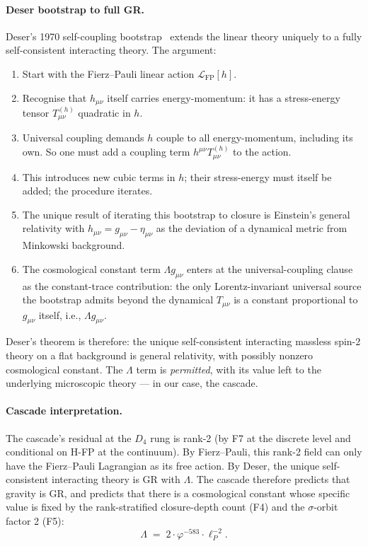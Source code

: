 \documentclass[11pt]{article}
\theoremstyle{plain}
\theoremstyle{definition}
\theoremstyle{remark}
\begin{document}
\paragraph{Deser bootstrap to full GR.}
Deser's 1970 self-coupling bootstrap~\citep{Deser1970} extends the linear theory uniquely to a fully self-consistent interacting theory. The argument:
\begin{enumerate}[leftmargin=2em]
\item Start with the Fierz--Pauli linear action $\mathcal{L}_\mathrm{FP}[h]$.
\item Recognise that $h_{\mu\nu}$ itself carries energy-momentum: it has a stress-energy tensor $T_{\mu\nu}^{(h)}$ quadratic in $h$.
\item Universal coupling demands $h$ couple to all energy-momentum, including its own. So one must add a coupling term $h^{\mu\nu} T_{\mu\nu}^{(h)}$ to the action.
\item This introduces new cubic terms in $h$; their stress-energy must itself be added; the procedure iterates.
\item The unique result of iterating this bootstrap to closure is Einstein's general relativity with $h_{\mu\nu} = g_{\mu\nu} - \eta_{\mu\nu}$ as the deviation of a dynamical metric from Minkowski background.
\item The cosmological constant term $\Lambda g_{\mu\nu}$ enters at the universal-coupling clause as the constant-trace contribution: the only Lorentz-invariant universal source the bootstrap admits beyond the dynamical $T_{\mu\nu}$ is a constant proportional to $g_{\mu\nu}$ itself, i.e., $\Lambda g_{\mu\nu}$.
\end{enumerate}
Deser's theorem is therefore: the unique self-consistent interacting massless spin-2 theory on a flat background is general relativity, with possibly nonzero cosmological constant. The $\Lambda$ term is \emph{permitted}, with its value left to the underlying microscopic theory --- in our case, the cascade.

\paragraph{Cascade interpretation.}
The cascade's residual at the $D_4$ rung is rank-2 (by F7 at the discrete level and conditional on H-FP at the continuum). By Fierz--Pauli, this rank-2 field can only have the Fierz--Pauli Lagrangian as its free action. By Deser, the unique self-consistent interacting theory is GR with $\Lambda$. The cascade therefore predicts that gravity is GR, and predicts that there is a cosmological constant whose specific value is fixed by the rank-stratified closure-depth count (F4) and the $\sigma$-orbit factor 2 (F5):
\[
  \Lambda \;=\; 2 \cdot \varphi^{-583} \cdot \ell_P^{-2}.
\]
\end{document}
